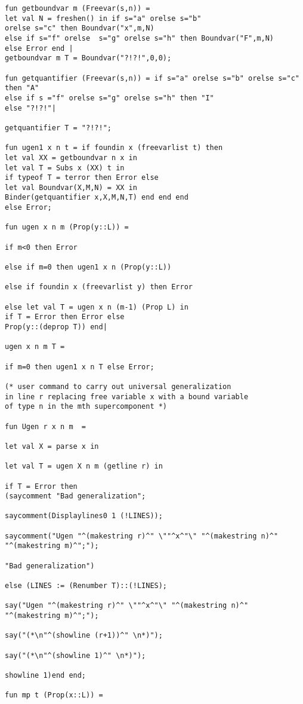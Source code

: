 \documentclass{article}
\begin{document}
{{\begin{verbatim}
fun getboundvar m (Freevar(s,n)) = 
let val N = freshen() in if s="a" orelse s="b" 
orelse s="c" then Boundvar("x",m,N)
else if s="f" orelse  s="g" orelse s="h" then Boundvar("F",m,N)
else Error end |
getboundvar m T = Boundvar("?!?!",0,0);

fun getquantifier (Freevar(s,n)) = if s="a" orelse s="b" orelse s="c" then "A"
else if s ="f" orelse s="g" orelse s="h" then "I" 
else "?!?!"|

getquantifier T = "?!?!";

fun ugen1 x n t = if foundin x (freevarlist t) then 
let val XX = getboundvar n x in
let val T = Subs x (XX) t in
if typeof T = terror then Error else
let val Boundvar(X,M,N) = XX in
Binder(getquantifier x,X,M,N,T) end end end
else Error;

fun ugen x n m (Prop(y::L)) =

if m<0 then Error

else if m=0 then ugen1 x n (Prop(y::L)) 

else if foundin x (freevarlist y) then Error

else let val T = ugen x n (m-1) (Prop L) in
if T = Error then Error else 
Prop(y::(deprop T)) end|

ugen x n m T = 

if m=0 then ugen1 x n T else Error;

(* user command to carry out universal generalization
in line r replacing free variable x with a bound variable
of type n in the mth supercomponent *)

fun Ugen r x n m  =

let val X = parse x in 

let val T = ugen X n m (getline r) in

if T = Error then 
(saycomment "Bad generalization";

saycomment(Displaylines0 1 (!LINES));

saycomment("Ugen "^(makestring r)^" \""^x^"\" "^(makestring n)^" "^(makestring m)^";");

"Bad generalization")

else (LINES := (Renumber T)::(!LINES);

say("Ugen "^(makestring r)^" \""^x^"\" "^(makestring n)^" "^(makestring m)^";");

say("(*\n"^(showline (r+1))^" \n*)"); 

say("(*\n"^(showline 1)^" \n*)");

showline 1)end end;

fun mp t (Prop(x::L)) = 


\end{verbatim}}}
\end{document}

